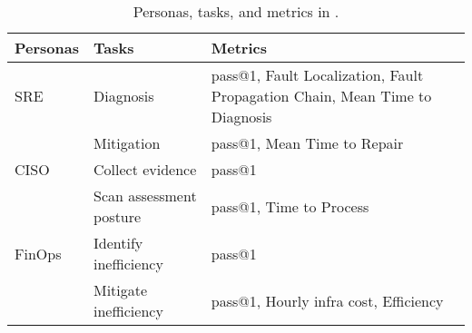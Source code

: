 \begin{table}[h]
    \centering
    \small
    \begin{threeparttable}
        \caption{Personas, tasks, and metrics in \bench.}
        \label{tab:bench_tasks_metrics}
        \begin{tabular}{llp{2.7cm}}
            \toprule
            \textbf{Personas} &  
            \textbf{Tasks} &
            \textbf{Metrics} \\
            \midrule
             SRE & Diagnosis & pass@1, Fault Localization, Fault Propagation Chain, Mean Time to Diagnosis\\
              &    Mitigation & pass@1, Mean Time to Repair  \\
            \midrule
              CISO & Collect evidence & pass@1   \\
                   & Scan assessment posture & pass@1, Time to Process  \\
            \midrule
             FinOps & Identify inefficiency & pass@1 \\
             &    Mitigate inefficiency & pass@1, Hourly infra cost, Efficiency \\
            \bottomrule
        \end{tabular}
    \end{threeparttable}
\end{table}








